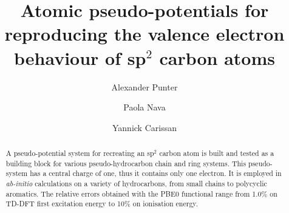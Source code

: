 \documentclass[aip]{revtex4-1}
\begin{document}
\title{Atomic pseudo-potentials for reproducing the valence electron behaviour of sp$^2$ carbon atoms}
\author{Alexander Punter}
\author{Paola Nava}
\author{Yannick Carissan}

\begin{abstract}
A pseudo-potential system for recreating an sp\(^{2}\) carbon atom is built 
and tested as a building block for various pseudo-hydrocarbon chain and ring systems.  
This pseudo-system has a central charge of one, thus it contains only one
electron. It is employed in \textsl{ab-initio} calculations on a variety of hydrocarbons, from small chains to polycyclic aromatics.
The relative errors obtained with the PBE0 functional range from
1.0\% on TD-DFT first excitation energy to 10\% on ionisation
energy.
\end{abstract}
\maketitle



\begin{figure}[h]
\centering
\colorbox{background-color}{
}
\end{figure}
\end{document}
